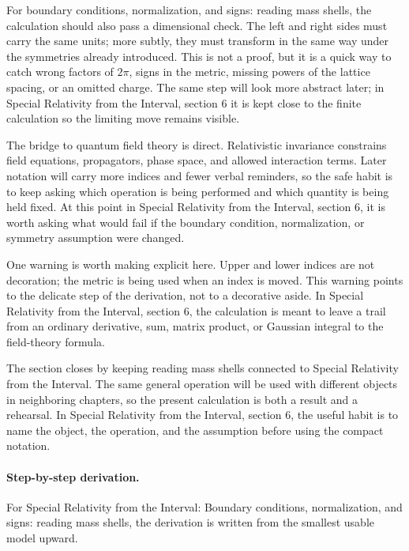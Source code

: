 For boundary conditions, normalization, and signs: reading mass shells, the calculation should also pass a dimensional check.  The left and right sides must carry the same units; more subtly, they must transform in the same way under the symmetries already introduced.  This is not a proof, but it is a quick way to catch wrong factors of \(2\pi\), signs in the metric, missing powers of the lattice spacing, or an omitted charge.  The same step will look more abstract later; in Special Relativity from the Interval, section 6 it is kept close to the finite calculation so the limiting move remains visible.

The bridge to quantum field theory is direct.  Relativistic invariance constrains field equations, propagators, phase space, and allowed interaction terms.  Later notation will carry more indices and fewer verbal reminders, so the safe habit is to keep asking which operation is being performed and which quantity is being held fixed.  At this point in Special Relativity from the Interval, section 6, it is worth asking what would fail if the boundary condition, normalization, or symmetry assumption were changed.

One warning is worth making explicit here.  Upper and lower indices are not decoration; the metric is being used when an index is moved.  This warning points to the delicate step of the derivation, not to a decorative aside.  In Special Relativity from the Interval, section 6, the calculation is meant to leave a trail from an ordinary derivative, sum, matrix product, or Gaussian integral to the field-theory formula.

The section closes by keeping reading mass shells connected to Special Relativity from the Interval.  The same general operation will be used with different objects in neighboring chapters, so the present calculation is both a result and a rehearsal.  In Special Relativity from the Interval, section 6, the useful habit is to name the object, the operation, and the assumption before using the compact notation.



\paragraph{Step-by-step derivation.}

For Special Relativity from the Interval: Boundary conditions, normalization, and signs: reading mass shells, the derivation is written from the smallest usable model upward.

